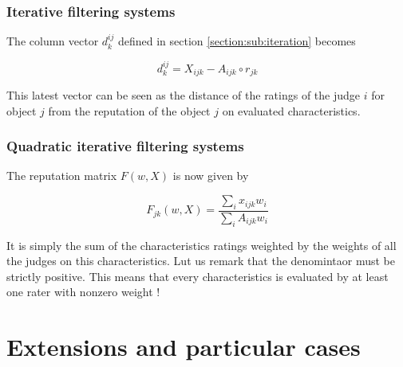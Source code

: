 \documentclass[12pt,a4paper]{article}
\begin{document}
\subsubsection{Iterative filtering systems}
 The column vector $d_k^{ij}$ defined in section \ref{section:sub:iteration} becomes
 
\[
    d^{ij}_k = X_{ijk} - A_{ijk}   \circ r_{jk}
\]


This latest vector can be seen as the distance of the ratings of the judge $i$ for object $j$ from the reputation of the object $j$ on evaluated characteristics.

\subsubsection{Quadratic iterative filtering systems}

The reputation matrix $F(w, X)$ is now given by

\[
    F_{jk}(w, X) = \frac{\sum_i x_{ijk}w_i}{\sum_i A_{ijk}w_i}
\]

It is simply the sum of the characteristics ratings weighted by the weights of all the judges on this characteristics. Lut us remark that the denomintaor must be strictly positive. This means that every characteristics is evaluated by at least one rater with nonzero weight !






\section{Extensions and particular cases}
\end{document}
